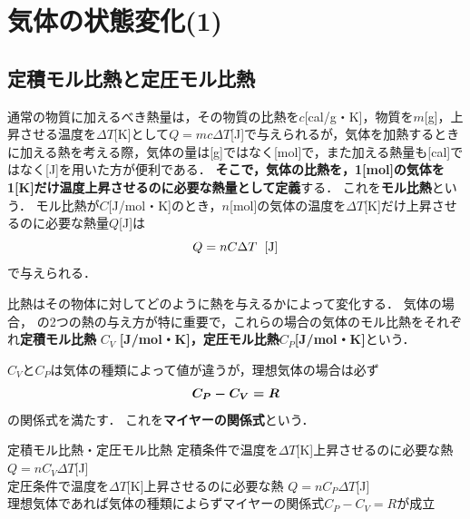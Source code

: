 \section{気体の状態変化(1)}

\setcounter{nombre}{7}

\subsection{定積モル比熱と定圧モル比熱}
通常の物質に加えるべき熱量は，その物質の比熱を$c$[cal/g・K]，物質を$m$[g]，上昇させる温度を$\Delta T$[K]として$Q=mc\Delta T$[J]で与えられるが，気体を加熱するときに加える熱を考える際，気体の量は[g]ではなく[mol]で，また加える熱量も[cal]ではなく[J]を用いた方が便利である．
{\bf そこで，気体の比熱を，1[mol]の気体を1[K]だけ温度上昇させるのに必要な熱量として定義}する．
これを{\bf モル比熱}という．
モル比熱が$C$[J/mol・K]のとき，$n$[mol]の気体の温度を$\Delta T$[K]だけ上昇させるのに必要な熱量$Q$[J]は
\[Q=nC\Delta T \hspace{2mm} [{\rm J}]\]
で与えられる．

比熱はその物体に対してどのように熱を与えるかによって変化する．
気体の場合，
の2つの熱の与え方が特に重要で，これらの場合の気体のモル比熱をそれぞれ{\bf 定積モル比熱} \mbox{\boldmath $C_V$} {\bf [J/mol・K]，定圧モル比熱}\mbox{\boldmath $C_P$}{\bf [J/mol・K]}という．

$C_V$と$C_P$は気体の種類によって値が違うが，理想気体の場合は必ず
\[\mbox{\boldmath $C_P-C_V=R$}\]
の関係式を満たす．
これを{\bf マイヤーの関係式}という．

\begin{matome}{定積モル比熱・定圧モル比熱}
 \hspace{3mm} 定積条件で温度を$\Delta T$[K]上昇させるのに必要な熱\hspace{5mm} $Q=nC_V\Delta T $[J]\\
 \hspace{3mm} 定圧条件で温度を$\Delta T$[K]上昇させるのに必要な熱\hspace{5mm} $Q=nC_P\Delta T $[J]\\
 \hspace{3mm}  理想気体であれば気体の種類によらずマイヤーの関係式$C_P-C_V=R$が成立
 \end{matome}

